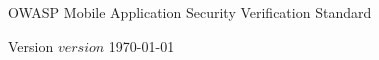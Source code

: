 \thispagestyle{empty} %

OWASP Mobile Application Security Verification Standard


Version $version$ \today
